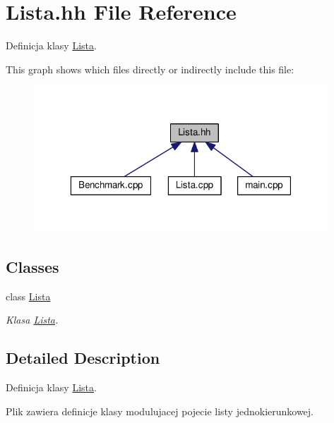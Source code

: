 \hypertarget{a00016}{}\section{Lista.\+hh File Reference}
\label{a00016}


Definicja klasy \hyperlink{a00005}{Lista}.  


This graph shows which files directly or indirectly include this file\+:\nopagebreak
\begin{figure}[H]
\begin{center}
\leavevmode
\includegraphics[width=313pt]{a00034}
\end{center}
\end{figure}
\subsection*{Classes}
\begin{DoxyCompactItemize}
\item 
class \hyperlink{a00005}{Lista}
\begin{DoxyCompactList}\small\item\em Klasa \hyperlink{a00005}{Lista}. \end{DoxyCompactList}\end{DoxyCompactItemize}


\subsection{Detailed Description}
Definicja klasy \hyperlink{a00005}{Lista}. 

Plik zawiera definicje klasy modulujacej pojecie listy jednokierunkowej. 